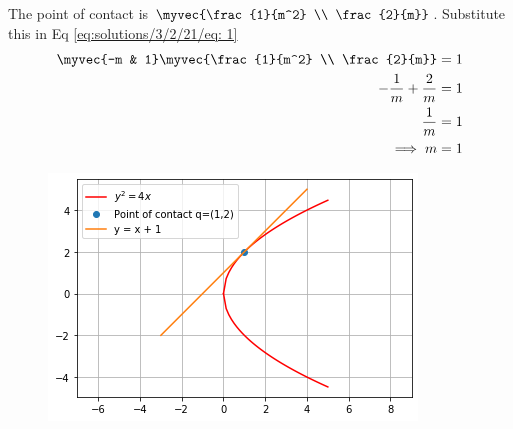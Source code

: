 The point of contact is $\myvec{\frac{1}{m^2} \\ \frac{2}{m}}$. Substitute this in Eq \eqref{eq:solutions/3/2/21/eq: 1}
\begin{align}
    \myvec{-m & 1}\myvec{\frac{1}{m^2} \\ \frac{2}{m}} = 1\\
    -\frac{1}{m} + \frac{2}{m} = 1\\
    \frac{1}{m} = 1\\
    \implies m = 1
\end{align}
\begin{figure}[!ht]
\centering
\includegraphics[width=\columnwidth]{./solutions/conics/3/2/21/A5.png}
\caption{}
\label{eq:solutions/3/2/21/Fig:1}
\end{figure}
